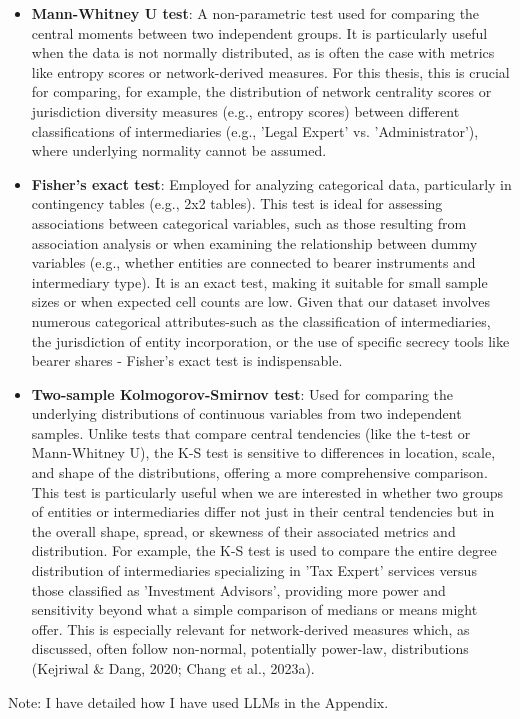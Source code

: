 \begin{itemize}
    \item \textbf{Mann-Whitney U test}: A non-parametric test used for comparing the central moments between two independent groups. It is particularly useful when the data is not normally distributed, as is often the case with metrics like entropy scores or network-derived measures. For this thesis, this is crucial for comparing, for example, the distribution of network centrality scores or jurisdiction diversity measures (e.g., entropy scores) between different classifications of intermediaries (e.g., 'Legal Expert' vs. 'Administrator'), where underlying normality cannot be assumed.

    \item \textbf{Fisher's exact test}: Employed for analyzing categorical data, particularly in contingency tables (e.g., 2x2 tables). This test is ideal for assessing associations between categorical variables, such as those resulting from association analysis or when examining the relationship between dummy variables (e.g., whether entities are connected to bearer instruments and intermediary type). It is an exact test, making it suitable for small sample sizes or when expected cell counts are low. Given that our dataset involves numerous categorical attributes-such as the classification of intermediaries, the jurisdiction of entity incorporation, or the use of specific secrecy tools like bearer shares - Fisher's exact test is indispensable.

    \item \textbf{Two-sample Kolmogorov-Smirnov test}: Used for comparing the underlying distributions of continuous variables from two independent samples. Unlike tests that compare central tendencies (like the t-test or Mann-Whitney U), the K-S test is sensitive to differences in location, scale, and shape of the distributions, offering a more comprehensive comparison. This test is particularly useful when we are interested in whether two groups of entities or intermediaries differ not just in their central tendencies but in the overall shape, spread, or skewness of their associated metrics and distribution. For example, the K-S test is used to compare the entire degree distribution of intermediaries specializing in 'Tax Expert' services versus those classified as 'Investment Advisors', providing more power and sensitivity beyond what a simple comparison of medians or means might offer. This is especially relevant for network-derived measures which, as discussed, often follow non-normal, potentially power-law, distributions (Kejriwal \& Dang, 2020; Chang et al., 2023a).
\end{itemize}

Note: I have detailed how I have used LLMs in the Appendix.

